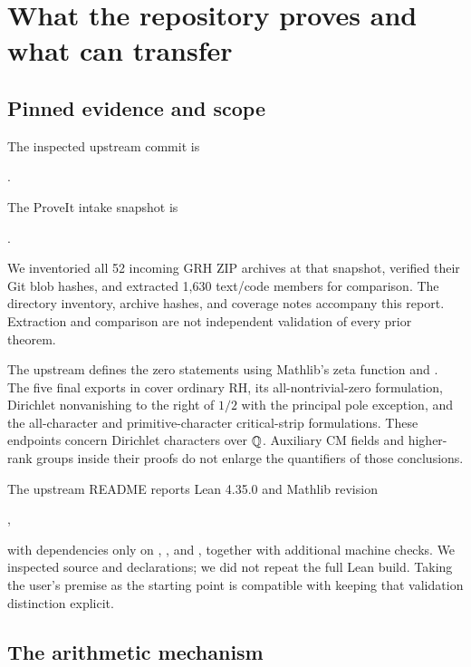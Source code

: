 \section{What the repository proves and what can transfer}
\label{sec:source}

\subsection{Pinned evidence and scope}

The inspected upstream commit is
\begin{center}.\end{center}
The ProveIt intake snapshot is
\begin{center}.\end{center}
We inventoried all 52 incoming GRH ZIP archives at that snapshot, verified their Git blob hashes, and extracted 1,630 text/code members for comparison. The directory inventory, archive hashes, and coverage notes accompany this report. Extraction and comparison are not independent validation of every prior theorem.

The upstream  defines the zero statements using Mathlib's zeta function and . The five final exports in  cover ordinary RH, its all-nontrivial-zero formulation, Dirichlet nonvanishing to the right of $1/2$ with the principal pole exception, and the all-character and primitive-character critical-strip formulations. These endpoints concern Dirichlet characters over $\mathbb Q$. Auxiliary CM fields and higher-rank groups inside their proofs do not enlarge the quantifiers of those conclusions.\cite{repo,statements}

The upstream README reports Lean 4.35.0 and Mathlib revision
\begin{center},\end{center}
with dependencies only on
, , and , together with additional machine checks. We inspected source and declarations; we did not repeat the full Lean build. Taking the user's premise as the starting point is compatible with keeping that validation distinction explicit.\cite{repo}

\subsection{The arithmetic mechanism}

